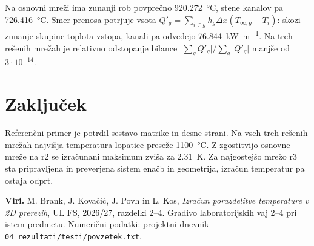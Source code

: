 \documentclass[a4paper,11pt]{article}
\begin{document}
Na osnovni mreži ima zunanji rob povprečno \SI{920.272}{\degreeCelsius}, stene kanalov pa \SI{726.416}{\degreeCelsius}. Smer prenosa potrjuje vsota \(Q'_g=\sum_{i\in g}h_g\Delta x(T_{\infty,g}-T_i)\): skozi zunanje skupine toplota vstopa, kanali pa odvedejo \SI{76.844}{\kilo\watt\per\metre}. Na treh rešenih mrežah je relativno odstopanje bilance \(\lvert\sum_g Q'_g\rvert/\sum_g\lvert Q'_g\rvert\) manjše od \(3\cdot10^{-14}\).

\section{Zaključek}
Referenčni primer je potrdil sestavo matrike in desne strani. Na vseh treh rešenih mrežah najvišja temperatura lopatice preseže \SI{1100}{\degreeCelsius}. Z zgostitvijo osnovne mreže na r2 se izračunani maksimum zviša za \SI{2.31}{\kelvin}. Za najgostejšo mrežo r3 sta pripravljena in preverjena sistem enačb in geometrija, izračun temperatur pa ostaja odprt.

\smallskip
{\footnotesize\textbf{Viri.} M. Brank, J. Kovačič, J. Povh in L. Kos, \emph{Izračun porazdelitve temperature v 2D prerezih}, UL FS, 2026/27, razdelki 2--4. Gradivo laboratorijskih vaj 2--4 pri istem predmetu. Numerični podatki: projektni dnevnik \texttt{04\_rezultati/testi/povzetek.txt}.}
\end{document}
